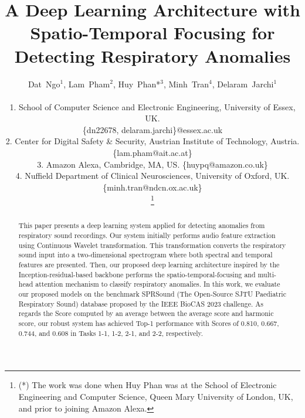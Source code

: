 \documentclass[conference]{IEEEtran}
\begin{document}
\title{A Deep Learning Architecture with Spatio-Temporal Focusing for Detecting Respiratory Anomalies
}
\author{Dat~Ngo$^{1}$, 
             Lam~Pham$^{2}$, 
             Huy~Phan*$^{3}$, 
             Minh~Tran$^{4}$,
             Delaram~Jarchi$^{1}$
             \\ \\
1. School of Computer Science and Electronic Engineering, University of Essex, UK.\\
\{dn22678, delaram.jarchi\}@essex.ac.uk \\            
2. Center for Digital Safety \& Security, Austrian Institute of Technology, Austria. \{lam.pham@ait.ac.at\} \\

3. Amazon Alexa, Cambridge, MA, US. \{huypq@amazon.co.uk\}  \\

4. Nuffield Department of Clinical Neurosciences, University of Oxford, UK. \{minh.tran@ndcn.ox.ac.uk\}\\


 \thanks{(*) The work was done when Huy Phan was at the School of Electronic Engineering and Computer Science, Queen Mary University of London, UK, and prior to joining Amazon Alexa.}
}



\maketitle

\begin{abstract}
This paper presents a deep learning system applied for detecting anomalies from respiratory sound recordings. Our system initially performs audio feature extraction using Continuous Wavelet transformation. This transformation converts the respiratory sound input into a two-dimensional spectrogram where both spectral and temporal features are presented. Then, our proposed deep learning architecture inspired by the Inception-residual-based backbone performs the spatio-temporal-focusing and multi-head attention mechanism to classify respiratory anomalies. In this work, we evaluate our proposed models on the benchmark SPRSound (The Open-Source SJTU Paediatric Respiratory Sound) database proposed by the IEEE BioCAS 2023 challenge. As regards the Score computed by an average between the average score and harmonic score, our robust system has achieved Top-1 performance with Scores of 0.810, 0.667, 0.744, and 0.608 in Tasks 1-1, 1-2, 2-1, and 2-2, respectively.
\end{abstract}
\end{document}
